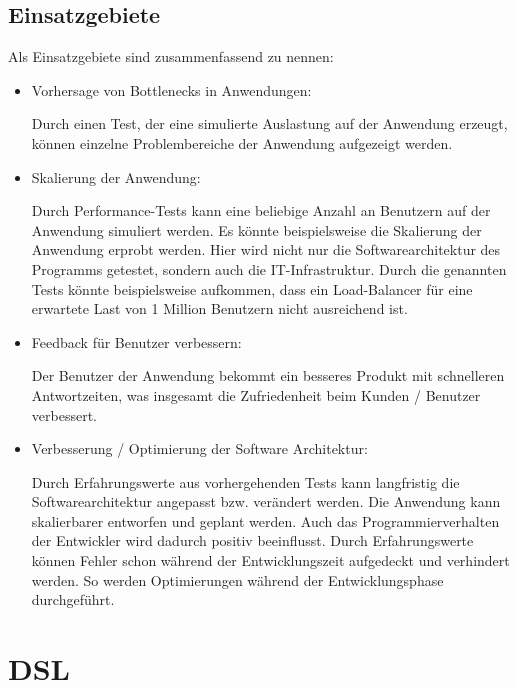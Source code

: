 \subsection{Einsatzgebiete}

Als Einsatzgebiete sind zusammenfassend zu nennen:

\begin{itemize}
    \item Vorhersage von Bottlenecks in Anwendungen:
   
    Durch einen Test, der eine simulierte Auslastung auf der Anwendung erzeugt, können einzelne Problembereiche der Anwendung aufgezeigt werden.
    
    \item Skalierung der Anwendung:

    Durch Performance-Tests kann eine beliebige Anzahl an Benutzern auf der Anwendung simuliert werden. Es könnte beispielsweise die Skalierung der Anwendung erprobt werden. Hier wird nicht nur die Softwarearchitektur des Programms getestet, sondern auch die IT-Infrastruktur. Durch die genannten Tests könnte beispielsweise aufkommen, dass ein Load-Balancer für eine erwartete Last von 1 Million Benutzern nicht ausreichend ist.
    
    \item Feedback für Benutzer verbessern:
    
    Der Benutzer der Anwendung bekommt ein besseres Produkt mit schnelleren Antwortzeiten, was insgesamt die Zufriedenheit beim Kunden / Benutzer verbessert.    
    
    \item Verbesserung / Optimierung der Software Architektur:
    
    Durch Erfahrungswerte aus vorhergehenden Tests kann langfristig die Softwarearchitektur angepasst bzw. verändert werden. Die Anwendung kann skalierbarer entworfen und geplant werden. Auch das Programmierverhalten der Entwickler wird dadurch positiv beeinflusst. Durch Erfahrungswerte können Fehler schon während der Entwicklungszeit aufgedeckt und verhindert werden. So werden Optimierungen während der Entwicklungsphase durchgeführt. 

\end{itemize}


\section{DSL}


